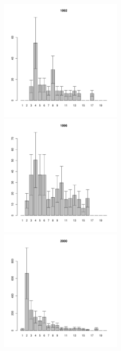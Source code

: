 \documentclass[12pt, a4paper]{article}
\begin{document}
\begin{figure}[h]

\begin{multicols}{3}
\hfill
\includegraphics[width=60mm]{../White_Sea/Luvenga_II_razrez/zostera_zone_1992_.pdf}
\hfill
\includegraphics[width=60mm]{../White_Sea/Luvenga_II_razrez/zostera_zone_1996_.pdf}
\hfill
\includegraphics[width=60mm]{../White_Sea/Luvenga_II_razrez/zostera_zone_2000_.pdf}
\end{multicols}




\end{figure}
\end{document}
